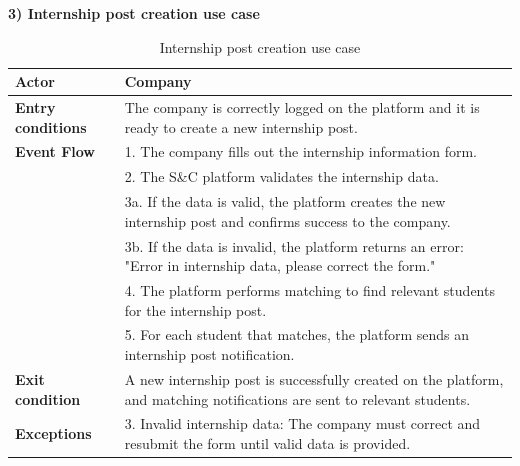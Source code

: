 \newpage
\textbf{3) Internship post creation use case}\\

\begin{table}[h!]
    \centering
    \begin{tabular}{lp{10cm}}
        \textbf{Actor} & Company \\ \hline
        \textbf{Entry conditions} & The company is correctly logged on the platform and it is ready to create a new internship post. \\ \hline
        \textbf{Event Flow} &
        1. The company fills out the internship information form. \\
        & 2. The S\&C platform validates the internship data. \\
        & 3a. If the data is valid, the platform creates the new internship post and confirms success to the company. \\
        & 3b. If the data is invalid, the platform returns an error: "Error in internship data, please correct the form." \\
        & 4. The platform performs matching to find relevant students for the internship post. \\
        & 5. For each student that matches, the platform sends an internship post notification. \\
        \hline
        \textbf{Exit condition} & A new internship post is successfully created on the platform, and matching notifications are sent to relevant students. \\ \hline
        \textbf{Exceptions} &
        3. Invalid internship data: The company must correct and resubmit the form until valid data is provided. \\
    \end{tabular}
    \caption{Internship post creation use case}
    \label{tab:internship_post_creation}
\end{table}



